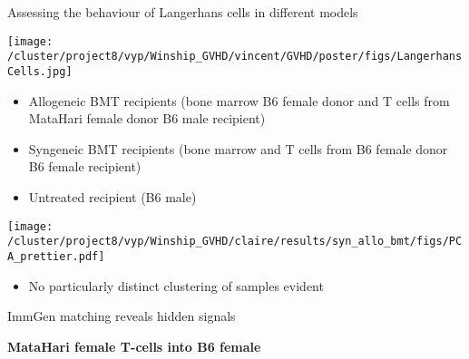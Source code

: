 \documentclass[final,hyperref={pdfpagelabels=false}]{beamer}
\begin{document}
\begin{frame}{}
\begin{columns}[t]
\begin{column}{.36\linewidth}
\begin{block}{Assessing the behaviour of Langerhans cells in different models}
    \begin{center}
      \texttt{[image: /cluster/project8/vyp/Winship\_GVHD/vincent/GVHD/poster/figs/LangerhansCells.jpg]}
    \end{center}
    \begin{itemize}
    \item Allogeneic BMT recipients (bone marrow B6 female donor and T cells from MataHari female donor B6 male recipient)
    \item Syngeneic BMT recipients (bone marrow and T cells from B6 female donor  B6 female recipient)
    \item Untreated recipient (B6 male)
    \end{itemize}

	\begin{minipage}{0.6\textwidth}
	  \texttt{[image: /cluster/project8/vyp/Winship\_GVHD/claire/results/syn\_allo\_bmt/figs/PCA\_prettier.pdf]}
	\end{minipage}
	\begin{minipage}{0.3\textwidth}
	  {\small             \begin{itemize}
    \item No particularly distinct clustering of samples evident
          \end{itemize}}
	\end{minipage}
  \end{block}
\vspace{3cm}

\begin{block}{ImmGen matching reveals hidden signals}

  {\bf MataHari female T-cells into B6 female}


\end{block}
\end{column}
\end{columns}
\end{frame}
\end{document}
